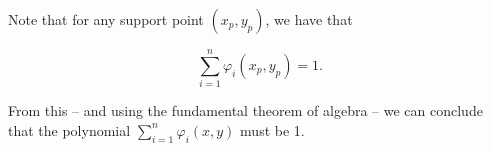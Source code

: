 \documentclass{article}
\renewcommand{\phi}{\varphi}
\begin{document}
Note that for any support point $(x_p,y_p)$, we have that

\begin{equation}
  \sum_{i=1}^n \phi_i(x_p,y_p) = 1.
\end{equation}

From this -- and using the fundamental theorem of algebra -- we can conclude that the polynomial $\sum_{i=1}^n \phi_i(x,y)$ must be 1.




\end{document}
